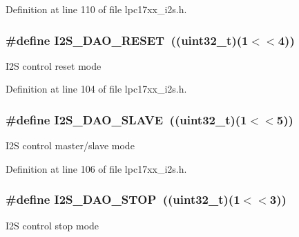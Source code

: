 \-Definition at line 110 of file lpc17xx\-\_\-i2s.\-h.

\hypertarget{group___i2_s___private___macros_ga7ec4a63719a45df4d30f42e03af0d9e6}{
\subsubsection[{\-I2\-S\-\_\-\-D\-A\-O\-\_\-\-R\-E\-S\-E\-T}]{\setlength{\rightskip}{0pt plus 5cm}\#define {\bf \-I2\-S\-\_\-\-D\-A\-O\-\_\-\-R\-E\-S\-E\-T}~((uint32\-\_\-t)(1$<$$<$4))}}\label{group___i2_s___private___macros_ga7ec4a63719a45df4d30f42e03af0d9e6}
\-I2\-S control reset mode 

\-Definition at line 104 of file lpc17xx\-\_\-i2s.\-h.

\hypertarget{group___i2_s___private___macros_ga58ea023dda649de724684288e703ef86}{
\subsubsection[{\-I2\-S\-\_\-\-D\-A\-O\-\_\-\-S\-L\-A\-V\-E}]{\setlength{\rightskip}{0pt plus 5cm}\#define {\bf \-I2\-S\-\_\-\-D\-A\-O\-\_\-\-S\-L\-A\-V\-E}~((uint32\-\_\-t)(1$<$$<$5))}}\label{group___i2_s___private___macros_ga58ea023dda649de724684288e703ef86}
\-I2\-S control master/slave mode 

\-Definition at line 106 of file lpc17xx\-\_\-i2s.\-h.

\hypertarget{group___i2_s___private___macros_gaa8e56c2dab6e3206093dd6575332253d}{
\subsubsection[{\-I2\-S\-\_\-\-D\-A\-O\-\_\-\-S\-T\-O\-P}]{\setlength{\rightskip}{0pt plus 5cm}\#define {\bf \-I2\-S\-\_\-\-D\-A\-O\-\_\-\-S\-T\-O\-P}~((uint32\-\_\-t)(1$<$$<$3))}}\label{group___i2_s___private___macros_gaa8e56c2dab6e3206093dd6575332253d}
\-I2\-S control stop mode 

